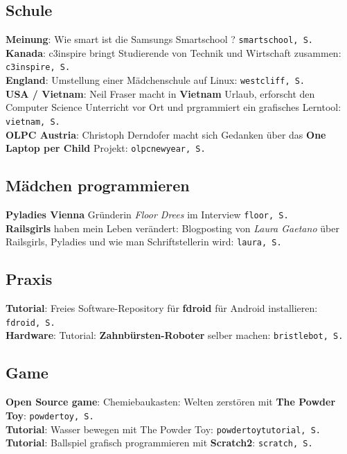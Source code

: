 \documentclass[10pt,a4paper,ngerman,twoside]{article} %
\begin{document}
\begin{multicols}{3}
\subsection*{Schule}

\textbf{Meinung}: Wie smart ist die Samsungs Smartschool ? \texttt{smartschool, S. \pageref{smartschool}}\\
\textbf{Kanada}: c3inspire bringt Studierende von Technik und Wirtschaft zusammen: \texttt{c3inspire, S. \pageref{c3inspire}}\\
\textbf{England}: Umstellung einer Mädchenschule auf Linux: \texttt{westcliff, S. \pageref{westcliff}}\\
\textbf{USA / Vietnam}: Neil Fraser macht in \textbf{Vietnam} Urlaub, erforscht den Computer Science Unterricht vor Ort und prgrammiert ein grafisches Lerntool: \texttt{vietnam, S. \pageref{vietnam}}\\ 
\textbf{OLPC Austria}: Christoph Derndofer macht sich Gedanken über das \textbf{One Laptop per Child} Projekt: \texttt{olpcnewyear, S. \pageref{olpcnewyear}}\\

\subsection*{Mädchen programmieren}

\textbf{Pyladies Vienna} Gründerin \textit{Floor Drees} im Interview \texttt{floor, S. \pageref{floor}}\\
\textbf{Railsgirls} haben mein Leben verändert: Blogposting von \textit{Laura Gaetano} über Railsgirls, Pyladies und wie man Schriftstellerin wird: \texttt{laura, S.\pageref{laura}}\\

\subsection*{Praxis}

\textbf{Tutorial}: Freies Software-Repository für \textbf{fdroid} für Android installieren: \texttt{fdroid, S. \pageref{fdroid}}\\ \textbf{Hardware}: Tutorial: \textbf{Zahnbürsten-Roboter} selber machen: \texttt{bristlebot, S. \pageref{bristlebot}}\\

\subsection*{Game}

\textbf{Open Source game}: Chemiebaukasten: Welten zerstören mit \textbf{The Powder Toy}: \texttt{powdertoy, S. \pageref{powdertoy}}\\
\textbf{Tutorial}: Wasser bewegen mit The Powder Toy: \texttt{powdertoytutorial, S. \pageref{powdertoytutorial}}\\
\textbf{Tutorial}: Ballspiel grafisch programmieren mit \textbf{Scratch2}: \texttt{scratch, S. \pageref{scratch}}\\
\end{multicols}
\end{document}
